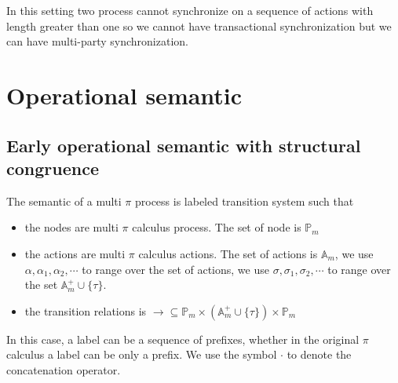 In this setting two process cannot synchronize on a sequence of actions with length greater than one so we cannot have transactional synchronization but we can have multi-party synchronization.


\section{Operational semantic}

\subsection{Early operational semantic with structural congruence}

The semantic of a multi $\pi$ process is labeled transition system such that
\begin{itemize}
  \item 
    the nodes are multi $\pi$ calculus process. The set of node is $\mathbb{P}_{m}$
  \item
    the actions are multi $\pi$ calculus actions. The set of actions is $\mathbb{A}_{m}$, we use $\alpha, \alpha_{1}, \alpha_{2},\cdots $ to range over the set of actions, we use $\sigma, \sigma_{1}, \sigma_{2}, \cdots $ to range over the set $\mathbb{A}_{m}^{+} \cup \{\tau\}$.
  \item
    the transition relations is $\rightarrow\subseteq \mathbb{P}_{m}\times (\mathbb{A}_{m}^{+} \cup \{\tau\})\times \mathbb{P}_{m}$
\end{itemize}

In this case, a label can be a sequence of prefixes, whether in the original $\pi$ calculus a label can be only a prefix. We use the symbol $\cdot$ to denote the concatenation operator.

